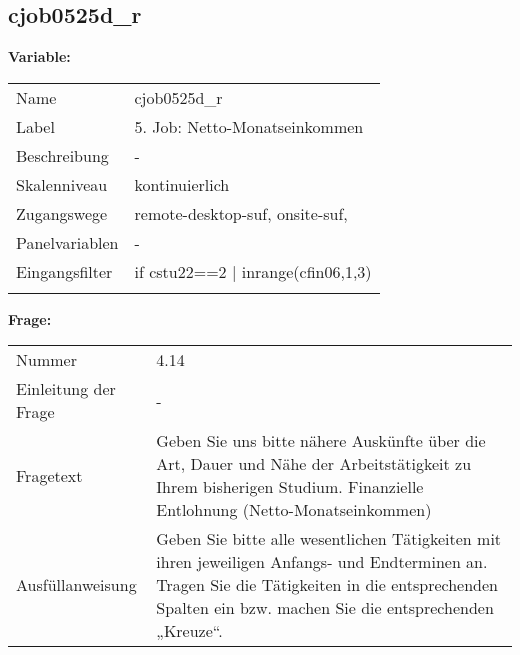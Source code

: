 	
	
	\subsection{cjob0525d\_r}
	\label{subSection:cjob0525d_r}

	\noindent\textbf{Variable:}\\
		\begin{tabular}{lL{11.3cm}}
			\label{tableVariable:cjob0525d_r}
			Name & cjob0525d\_r \\
			Label & 5. Job: Netto-Monatseinkommen \\
			Beschreibung & - \\
			Skalenniveau & kontinuierlich \\
			Zugangswege &
				remote-desktop-suf,
				onsite-suf,
 \\
			Panelvariablen & -
			 \\
			Eingangsfilter & if cstu22==2 | inrange(cfin06,1,3) \\
 \\
		\end{tabular}

		\vspace*{1 cm}
		\noindent\textbf{Frage:}\\
		\begin{tabular}{lL{11.3cm}}
			\label{tableQuestion:cjob0525d_r}
			Nummer & 4.14 \\
			Einleitung der Frage & - \\
			Fragetext & Geben Sie uns bitte nähere Auskünfte über die Art, Dauer und Nähe der Arbeitstätigkeit zu Ihrem bisherigen Studium.
Finanzielle Entlohnung
(Netto-Monatseinkommen) \\
			Ausfüllanweisung & Geben Sie bitte alle wesentlichen Tätigkeiten mit ihren jeweiligen Anfangs- und Endterminen an. Tragen Sie die Tätigkeiten in die entsprechenden Spalten ein bzw. machen Sie die entsprechenden „Kreuze“. \\
		\end{tabular}




